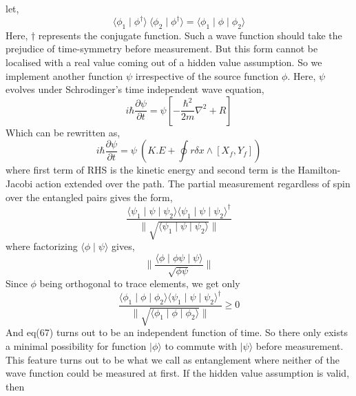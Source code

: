 \documentclass{article}
\begin{document}
 let, 
 \begin{equation}
     \langle \phi_1 \mid \phi^\dagger \rangle \ \langle \phi_2 \mid  \phi^\dagger \rangle = \langle \phi_1 \mid  \phi \mid  \phi_2 \rangle
 \end{equation} Here, $\dagger$ represents the conjugate function. Such a wave function should take the prejudice of time-symmetry before measurement. But this form cannot be localised with a real value coming out of a hidden value assumption. So we implement another function $\psi$ irrespective of the source function $\phi$. \newline
 Here, $\psi$ evolves under Schrodinger's time independent wave equation, \begin{equation}
      i\hbar \frac{\partial \psi}{\partial t} = \psi [-\frac{\hbar^2}{2m} \nabla^2 +R] 
 \end{equation} Which can be rewritten as,
 \begin{equation}
       i\hbar \frac{\partial \psi}{\partial t} = \psi \ (K.E + \oint r \delta x \wedge [X_f , Y_f] )
 \end{equation} where first term of RHS is the kinetic energy and second term is the Hamilton-Jacobi action extended over the path. The partial measurement regardless of spin over the entangled pairs gives the form,
 \begin{equation}
     \frac{\langle \psi_1 \mid  \psi \mid  \psi_2 \rangle \langle \psi_1 \mid  \psi\mid  \psi_2 \rangle^\dagger }{\parallel \sqrt{ \langle \psi_1 \mid  \psi \mid \psi_2 \rangle }\parallel} 
 \end{equation} where factorizing $\langle \phi \mid \psi \rangle $ gives,
 \begin{equation}
   \parallel \frac{\langle \phi \mid \phi \psi \mid \psi \rangle }{\sqrt{\phi \psi}} \parallel 
 \end{equation} Since $\phi$ being orthogonal to trace elements, we get only
 \begin{equation}
         \frac{\langle \phi_1 \mid  \phi \mid  \phi_2 \rangle \langle \psi_1 \mid  \psi\mid  \psi_2 \rangle^\dagger }{\parallel \sqrt{ \langle \phi_1 \mid  \phi \mid \phi_2 \rangle}\parallel} \geq 0
 \end{equation} And eq(67) turns out to be an independent function of time. So there only exists a minimal possibility for function $\mid \phi \rangle$ to commute with $\mid \psi \rangle$ before measurement. This feature turns out to be what we call as entanglement where neither of the wave function could be measured at first. If the hidden value assumption is valid, then
\end{document}
